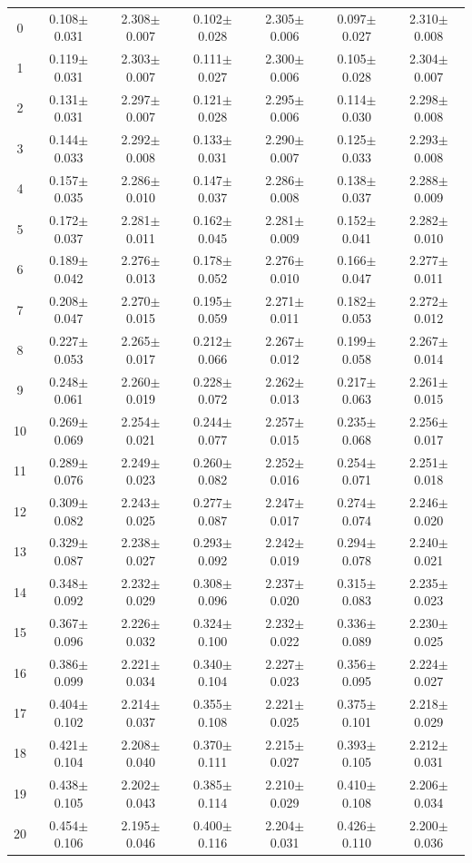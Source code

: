 \begin{table}[H]
{\begin{tabular}{c cc cc cc}
0 & 0.108$\pm$0.031 & 2.308$\pm$0.007 & 0.102$\pm$0.028 & 2.305$\pm$0.006 & 0.097$\pm$0.027 & 2.310$\pm$0.008 \\
1 & 0.119$\pm$0.031 & 2.303$\pm$0.007 & 0.111$\pm$0.027 & 2.300$\pm$0.006 & 0.105$\pm$0.028 & 2.304$\pm$0.007 \\
2 & 0.131$\pm$0.031 & 2.297$\pm$0.007 & 0.121$\pm$0.028 & 2.295$\pm$0.006 & 0.114$\pm$0.030 & 2.298$\pm$0.008 \\
3 & 0.144$\pm$0.033 & 2.292$\pm$0.008 & 0.133$\pm$0.031 & 2.290$\pm$0.007 & 0.125$\pm$0.033 & 2.293$\pm$0.008 \\
4 & 0.157$\pm$0.035 & 2.286$\pm$0.010 & 0.147$\pm$0.037 & 2.286$\pm$0.008 & 0.138$\pm$0.037 & 2.288$\pm$0.009 \\
5 & 0.172$\pm$0.037 & 2.281$\pm$0.011 & 0.162$\pm$0.045 & 2.281$\pm$0.009 & 0.152$\pm$0.041 & 2.282$\pm$0.010 \\
6 & 0.189$\pm$0.042 & 2.276$\pm$0.013 & 0.178$\pm$0.052 & 2.276$\pm$0.010 & 0.166$\pm$0.047 & 2.277$\pm$0.011 \\
7 & 0.208$\pm$0.047 & 2.270$\pm$0.015 & 0.195$\pm$0.059 & 2.271$\pm$0.011 & 0.182$\pm$0.053 & 2.272$\pm$0.012 \\
8 & 0.227$\pm$0.053 & 2.265$\pm$0.017 & 0.212$\pm$0.066 & 2.267$\pm$0.012 & 0.199$\pm$0.058 & 2.267$\pm$0.014 \\
9 & 0.248$\pm$0.061 & 2.260$\pm$0.019 & 0.228$\pm$0.072 & 2.262$\pm$0.013 & 0.217$\pm$0.063 & 2.261$\pm$0.015 \\
10 & 0.269$\pm$0.069 & 2.254$\pm$0.021 & 0.244$\pm$0.077 & 2.257$\pm$0.015 & 0.235$\pm$0.068 & 2.256$\pm$0.017 \\
11 & 0.289$\pm$0.076 & 2.249$\pm$0.023 & 0.260$\pm$0.082 & 2.252$\pm$0.016 & 0.254$\pm$0.071 & 2.251$\pm$0.018 \\
12 & 0.309$\pm$0.082 & 2.243$\pm$0.025 & 0.277$\pm$0.087 & 2.247$\pm$0.017 & 0.274$\pm$0.074 & 2.246$\pm$0.020 \\
13 & 0.329$\pm$0.087 & 2.238$\pm$0.027 & 0.293$\pm$0.092 & 2.242$\pm$0.019 & 0.294$\pm$0.078 & 2.240$\pm$0.021 \\
14 & 0.348$\pm$0.092 & 2.232$\pm$0.029 & 0.308$\pm$0.096 & 2.237$\pm$0.020 & 0.315$\pm$0.083 & 2.235$\pm$0.023 \\
15 & 0.367$\pm$0.096 & 2.226$\pm$0.032 & 0.324$\pm$0.100 & 2.232$\pm$0.022 & 0.336$\pm$0.089 & 2.230$\pm$0.025 \\
16 & 0.386$\pm$0.099 & 2.221$\pm$0.034 & 0.340$\pm$0.104 & 2.227$\pm$0.023 & 0.356$\pm$0.095 & 2.224$\pm$0.027 \\
17 & 0.404$\pm$0.102 & 2.214$\pm$0.037 & 0.355$\pm$0.108 & 2.221$\pm$0.025 & 0.375$\pm$0.101 & 2.218$\pm$0.029 \\
18 & 0.421$\pm$0.104 & 2.208$\pm$0.040 & 0.370$\pm$0.111 & 2.215$\pm$0.027 & 0.393$\pm$0.105 & 2.212$\pm$0.031 \\
19 & 0.438$\pm$0.105 & 2.202$\pm$0.043 & 0.385$\pm$0.114 & 2.210$\pm$0.029 & 0.410$\pm$0.108 & 2.206$\pm$0.034 \\
20 & 0.454$\pm$0.106 & 2.195$\pm$0.046 & 0.400$\pm$0.116 & 2.204$\pm$0.031 & 0.426$\pm$0.110 & 2.200$\pm$0.036 \\


\end{tabular}}
\end{table}
